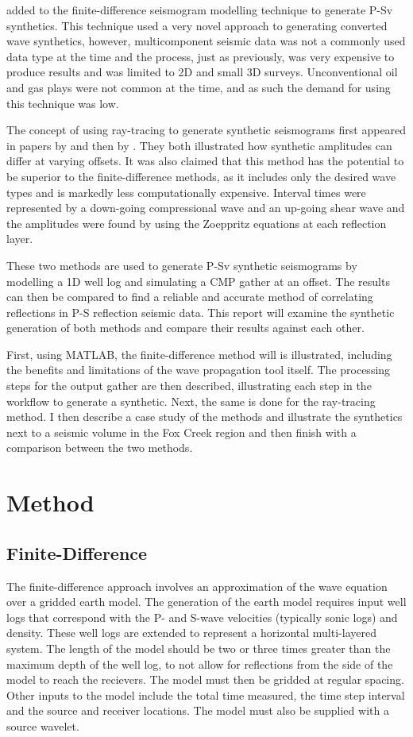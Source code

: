 \documentclass[12pt]{article}
\begin{document}
	\cite{levander1988} added to the finite-difference seismogram modelling technique to generate P-Sv synthetics. This technique used a very novel approach to generating converted wave synthetics, however, multicomponent seismic data was not a commonly used data type at the time and the process, just as previously, was very expensive to produce results and was limited to 2D and small 3D surveys. Unconventional oil and gas plays were not common at the time, and as such the demand for using this technique was low. 

	The concept of using ray-tracing to generate synthetic seismograms first appeared in papers by \cite{Thurston1990} and then by \cite{Hanyga1995}. They both illustrated how synthetic amplitudes can differ at varying offsets. It was also claimed that this method has the potential to be superior to the finite-difference methods, as it includes only the desired wave types and is markedly less computationally expensive. Interval times were represented by a down-going compressional wave and an up-going shear wave and the amplitudes were found by using the Zoeppritz equations at each reflection layer. 
	
	These two methods are used to generate P-Sv synthetic seismograms by modelling a 1D well log and simulating a CMP gather at an offset. The results can then be compared to find a reliable and accurate method of correlating reflections in P-S reflection seismic data. This report will examine the synthetic generation of both methods and compare their results against each other. 
	
	First, using MATLAB, the finite-difference method will is illustrated, including the benefits and limitations of the wave propagation tool itself. The processing steps for the output gather are then described, illustrating each step in the workflow to generate a synthetic. Next, the same is done for the ray-tracing method. I then describe a case study of the methods and illustrate the synthetics next to a seismic volume in the Fox Creek region and then finish with a comparison between the two methods. 
\section{Method}
\subsection{Finite-Difference}
	
	The finite-difference approach involves an approximation of the wave equation over a gridded earth model. The generation of the earth model requires input well logs that correspond with the P- and S-wave velocities (typically sonic logs) and density. These well logs are extended to represent a horizontal multi-layered system. The length of the model should be two or three times greater than the maximum depth of the well log, to not allow for reflections from the side of the model to reach the recievers. The model must then be gridded at regular spacing. Other inputs to the model include the total time measured, the time step interval and the source and receiver locations. The model must also be supplied with a source wavelet.
\end{document}
